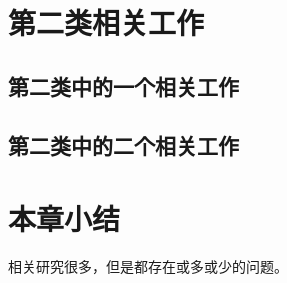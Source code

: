 \section{第二类相关工作}

\subsection{第二类中的一个相关工作}

\subsection{第二类中的二个相关工作}

\section{本章小结}

相关研究很多，但是都存在或多或少的问题。